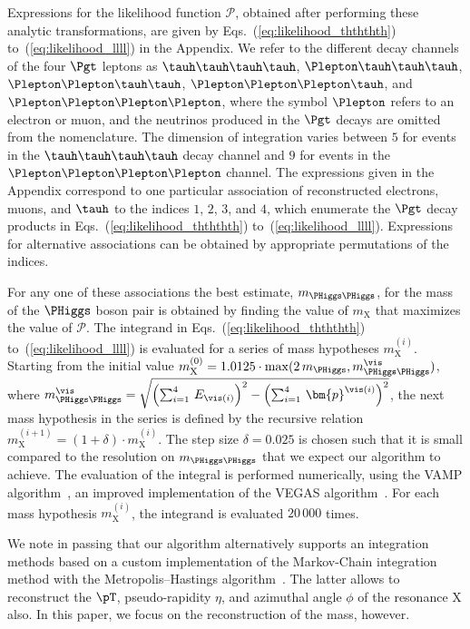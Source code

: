 Expressions for the likelihood function $\mathcal{P}$, obtained after performing these analytic transformations, 
are given by Eqs.~(\ref{eq:likelihood_thththth}) to~(\ref{eq:likelihood_llll}) in the Appendix.
We refer to the different decay channels of the four $\Pgt$ leptons as 
$\tauh\tauh\tauh\tauh$, $\Plepton\tauh\tauh\tauh$, $\Plepton\Plepton\tauh\tauh$, $\Plepton\Plepton\Plepton\tauh$, and $\Plepton\Plepton\Plepton\Plepton$, 
where the symbol $\Plepton$ refers to an electron or muon,
and the neutrinos produced in the $\Pgt$ decays are omitted from the nomenclature.
The dimension of integration varies between $5$ for events in the $\tauh\tauh\tauh\tauh$ decay channel and $9$ for events in the $\Plepton\Plepton\Plepton\Plepton$ channel.
The expressions given in the Appendix correspond to one particular association of reconstructed electrons, muons, and $\tauh$ 
to the indices $1$, $2$, $3$, and $4$, which enumerate the $\Pgt$ decay products in Eqs.~(\ref{eq:likelihood_thththth}) to~(\ref{eq:likelihood_llll}).
Expressions for alternative associations can be obtained by appropriate permutations of the indices.

For any one of these associations
the best estimate, $m_{\PHiggs\PHiggs}$, for the mass of the $\PHiggs$ boson pair is obtained 
by finding the value of $m_{\textrm{X}}$ that maximizes the value of $\mathcal{P}$.
The integrand in Eqs.~(\ref{eq:likelihood_thththth}) to~(\ref{eq:likelihood_llll})
is evaluated for a series of mass hypotheses $m_{\textrm{X}}^{(i)}$.
Starting from the initial value $m_{\textrm{X}}^{(0)} = 1.0125 \cdot \max (2 \, m_{\PHiggs}, m_{\PHiggs\PHiggs}^{\vis})$,
where
$m_{\PHiggs\PHiggs}^{\vis} = \sqrt{\left(\sum_{i=1}^{4} \, E_{\vis(i)}\right)^{2} - \left(\sum_{i=1}^{4} \, \bm{p}^{\vis(i)}\right)^{2}}$,
the next mass hypothesis in the series is defined by the recursive relation $m_{\textrm{X}}^{(i+1)} = (1 + \delta) \cdot m_{\textrm{X}}^{(i)}$.
The step size $\delta = 0.025$ is chosen such that it is small compared to the resolution on $m_{\PHiggs\PHiggs}$
that we expect our algorithm to achieve.
The evaluation of the integral is performed numerically, using the VAMP algorithm~\cite{VAMP},
an improved implementation of the VEGAS algorithm~\cite{VEGAS}.
For each mass hypothesis $m_{\textrm{X}}^{(i)}$, the integrand is evaluated $20\,000$ times.

We note in passing that our algorithm alternatively supports an integration methods based on a custom implementation
of the Markov-Chain integration method with the Metropolis--Hastings algorithm~\cite{Metropolis_Hastings}.
The latter allows to reconstruct the $\pT$, pseudo-rapidity $\eta$, and azimuthal angle $\phi$ of the resonance $\textrm{X}$ also.
In this paper, we focus on the reconstruction of the mass, however.

